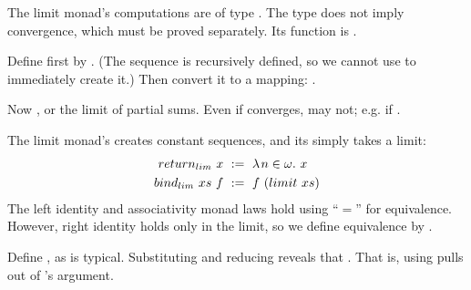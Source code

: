 The limit monad's computations are of type \tlzfc{\lnat \to \metricuniv}. The type does not imply convergence, which must be proved separately. Its  function is .

\begin{example}
Define  first by
.
(The sequence is recursively defined, so we cannot use  to immediately create it.)
Then convert it to a mapping: .
\begin{comment}
\begin{equation}
\lzfc{
  partial!sums~xs\ \objdef\ 
  \ilzfclet{
    ys~n & if~(n = 0)~(xs~0)~((xs~n) + (ys~(n - 1)))
  }{ys\lvert_\lnat}
}
\end{equation}
\end{comment}

Now
, or the limit of partial sums.
Even if \tlzfc{xs} converges, \tlzfc{partial!sums~xs} may not; e.g. if \tlzfc{xs = \fun{n \in \lnat} \frac{1}{n+1}}.
\exampleqed
\end{example}

The limit monad's  creates constant sequences, and its
 simply takes a limit:
\begin{equation}
\begin{aligned}
  return_{lim}~x &\ :=\ \lambda\mspace{2mu}{n \in \omega}\ldotp\,{x} \\
  bind_{lim}~xs~f &\ :=\ f~(limit~xs)
\end{aligned}
\end{equation}
The left identity and associativity monad laws hold using ``$=$'' for equivalence. However, right identity holds only in the limit, so we define equivalence by .

\begin{example}[lifting]
Define , as is typical. Substituting  and reducing reveals that . That is, using  pulls  out of 's argument.
\exampleqed
\end{example}

